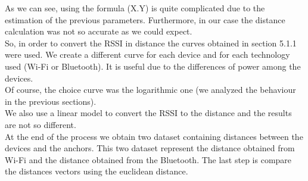 \linebreak
As we can see, using the formula (X.Y) is quite complicated due to the estimation of the previous parameters. Furthermore, in our case the distance calculation was not so accurate as we could expect.\\
\linebreak
So, in order to convert the RSSI in distance the curves obtained in section 5.1.1 were used. We create a different curve for each device and for each technology used (Wi-Fi or Bluetooth). It is useful due to the differences of power among the devices.\\
\linebreak
Of course, the choice curve was the logarithmic one (we analyzed the behaviour in the previous sections).\\
We also use a linear model to convert the RSSI to the distance and the results are not so different.\\
\linebreak
At the end of the process we obtain two dataset containing distances between the devices and the anchors. This two dataset represent the distance obtained from Wi-Fi and the distance obtained from the Bluetooth. The last step is compare the distances vectors using the euclidean distance.


